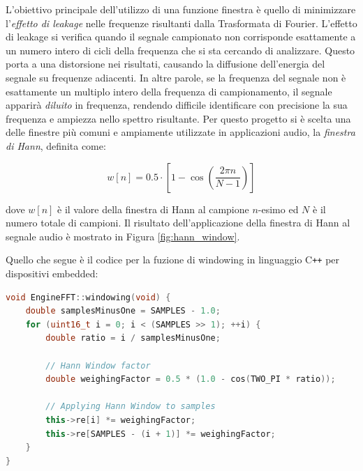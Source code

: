 \documentclass[a4paper,12pt]{report}  %
\begin{document}
L'obiettivo principale dell'utilizzo di una funzione finestra è quello di minimizzare l'\textit{eﬀetto di leakage} nelle frequenze risultanti dalla Trasformata di Fourier.
L'effetto di leakage si verifica quando il segnale campionato non corrisponde esattamente a un numero intero di cicli della frequenza che si sta cercando di analizzare.
Questo porta a una distorsione nei risultati, causando la diffusione dell'energia del segnale su frequenze adiacenti.
In altre parole, se la frequenza del segnale non è esattamente un multiplo intero della frequenza di campionamento, il segnale apparirà \textit{diluito} in frequenza, rendendo difficile identificare con precisione la sua frequenza e ampiezza nello spettro risultante.
Per questo progetto si è scelta una delle finestre più comuni e ampiamente utilizzate in applicazioni audio, la \textit{finestra di Hann}, definita come:

\begin{equation}
    w[n] = 0.5 \cdot \left [ 1 - \cos \left( \frac{2 \pi n}{N - 1} \right) \right ] \nonumber
\end{equation}

dove $w[n]$ è il valore della finestra di Hann al campione $n$-esimo ed $N$ è il numero totale di campioni.
Il risultato dell'applicazione della finestra di Hann al segnale audio è mostrato in Figura \ref{fig:hann_window}.

Quello che segue è il codice per la fuzione di windowing in linguaggio C\texttt{++} per dispositivi embedded:

\begin{lstlisting}[language=C++,keywords={void, double, float, this, uint16_t, this, for, cos, TWO_PI}]
void EngineFFT::windowing(void) {
    double samplesMinusOne = SAMPLES - 1.0;
    for (uint16_t i = 0; i < (SAMPLES >> 1); ++i) {
        double ratio = i / samplesMinusOne;
    
        // Hann Window factor
        double weighingFactor = 0.5 * (1.0 - cos(TWO_PI * ratio));
    
        // Applying Hann Window to samples
        this->re[i] *= weighingFactor;
        this->re[SAMPLES - (i + 1)] *= weighingFactor;
    }
}
\end{lstlisting}
\end{document}
